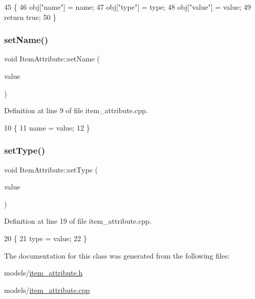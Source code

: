 \begin{DoxyCode}
45 \{
46     obj[\textcolor{stringliteral}{"name"}] = name;
47     obj[\textcolor{stringliteral}{"type"}] = type;
48     obj[\textcolor{stringliteral}{"value"}] = value;
49     \textcolor{keywordflow}{return} \textcolor{keyword}{true};
50 \}
\end{DoxyCode}
\mbox{\label{class_item_attribute_a2eac222eddafebcddad8aaa8e7926ffd}} 
\subsubsection{\texorpdfstring{set\+Name()}{setName()}}
{\footnotesize\ttfamily void Item\+Attribute\+::set\+Name (\begin{DoxyParamCaption}\item[{const Q\+String \&}]{value }\end{DoxyParamCaption})}



Definition at line 9 of file item\+\_\+attribute.\+cpp.


\begin{DoxyCode}
10 \{
11     name = value;
12 \}
\end{DoxyCode}
\mbox{\label{class_item_attribute_a3c763039c2ba34ab53c5c8fa46b655d7}} 
\subsubsection{\texorpdfstring{set\+Type()}{setType()}}
{\footnotesize\ttfamily void Item\+Attribute\+::set\+Type (\begin{DoxyParamCaption}\item[{int}]{value }\end{DoxyParamCaption})}



Definition at line 19 of file item\+\_\+attribute.\+cpp.


\begin{DoxyCode}
20 \{
21     type = value;
22 \}
\end{DoxyCode}


The documentation for this class was generated from the following files\+:\begin{DoxyCompactItemize}
\item 
models/\hyperlink{item__attribute_8h}{item\+\_\+attribute.\+h}\item 
models/\hyperlink{item__attribute_8cpp}{item\+\_\+attribute.\+cpp}\end{DoxyCompactItemize}
